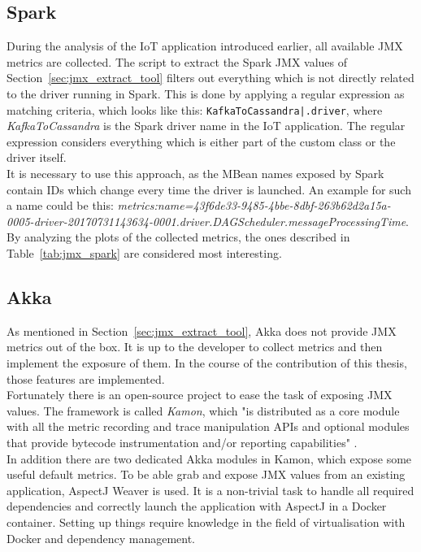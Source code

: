 \subsection{Spark}
During the analysis of the IoT application introduced earlier, all available JMX metrics are collected.
The script to extract the Spark JMX values of Section~\ref{sec:jmx_extract_tool} filters out everything which is not directly related to the driver running in Spark.
This is done by applying a regular expression as matching criteria, which looks like this: \verb"KafkaToCassandra|.driver", where \textit{KafkaToCassandra} is the Spark driver name in the IoT application.
The regular expression considers everything which is either part of the custom class or the driver itself.\\
It is necessary to use this approach, as the MBean names exposed by Spark contain IDs which change every time the driver is launched.
An example for such a name could be this: \textit{metrics:name=43f6de33-9485-4bbe-8dbf-263b62d2a15a-0005-driver-20170731143634-0001.driver.DAGScheduler.messageProcessingTime}.\\
By analyzing the plots of the collected metrics, the ones described in Table~\ref{tab:jmx_spark} are considered most interesting.

\subsection{Akka}
As mentioned in Section~\ref{sec:jmx_extract_tool}, Akka does not provide JMX metrics out of the box.
It is up to the developer to collect metrics and then implement the exposure of them.
In the course of the contribution of this thesis, those features are implemented.\\

Fortunately there is an open-source project to ease the task of exposing JMX values.
The framework is called \textit{Kamon}, which "is distributed as a core module with all the metric recording and trace manipulation APIs and optional modules that provide bytecode instrumentation and/or reporting capabilities" \cite{kamon}.\\
In addition there are two dedicated Akka modules in Kamon, which expose some useful default metrics.
To be able grab and expose JMX values from an existing application, AspectJ Weaver is used.
It is a non-trivial task to handle all required dependencies and correctly launch the application with AspectJ in a Docker container.
Setting up things require knowledge in the field of virtualisation with Docker and dependency management.\\

